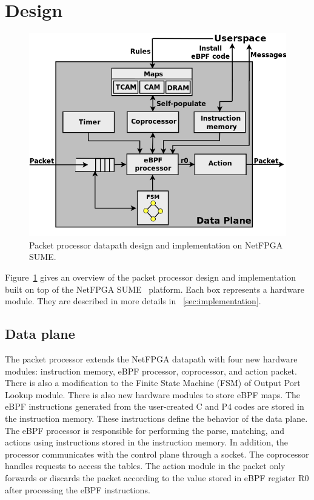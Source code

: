 \section{\system Design}
\label{sec:design}

\begin{figure}[t]
\centering
\includegraphics[width=1.\linewidth]{figures/06_fig01.png}
\caption{Packet processor datapath design and implementation on NetFPGA SUME.}
\label{fig:06_fig01}
\end{figure}

Figure~\ref{fig:06_fig01} gives an overview of the packet processor design and implementation built on top of the NetFPGA SUME~\cite{SUME2014} platform. 
Each box represents a hardware module.
They are described in more details in \textsection~\ref{sec:implementation}.


\subsection{Data plane}

The packet processor extends the NetFPGA datapath with four new hardware modules: instruction memory, eBPF processor, coprocessor, and action packet. There is also a modification to the Finite State Machine (FSM) of Output Port Lookup module.
There is also new hardware modules to store eBPF maps.
The eBPF instructions generated from the user-created C and P4 codes are stored in the instruction memory. These instructions define the behavior of the data plane. The eBPF processor is responsible for performing the parse, matching, and actions using instructions stored in the instruction memory. In addition, the processor communicates with the control plane through a socket. The coprocessor handles requests to access the tables. The action module in the packet only forwards or discards the packet according to the value stored in eBPF register R0 after processing the eBPF instructions. %

